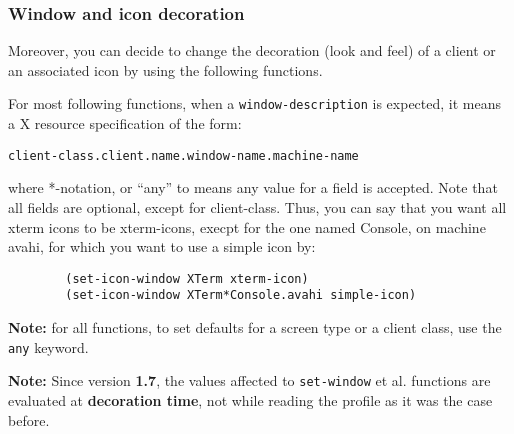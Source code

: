 \subsubsection{Window and icon decoration}

Moreover, you can decide to change the decoration (look and feel)
of a client or an associated icon by using the following functions.

For most following functions, when a \verb|window-description| is expected, it
means a X resource specification of the form:
\begin{verbatim}
client-class.client.name.window-name.machine-name
\end{verbatim}
where *-notation, or ``any'' to means any value for a field is accepted. Note
that all fields are optional, except for client-class.
Thus, you can say that you want all xterm icons to be xterm-icons, execpt for
the one named Console, on machine avahi, for which you want to use
a simple icon by:
{\exemplefont\begin{verbatim}
        (set-icon-window XTerm xterm-icon)
        (set-icon-window XTerm*Console.avahi simple-icon)
\end{verbatim}}

{\bf Note:} for all functions, to set defaults for a screen type or a client
class, use the \verb"any" keyword.

{\bf Note:} Since version {\bf 1.7}, the values affected to \verb|set-window|
et al. functions are evaluated at {\bf decoration time}, not while reading the
profile as it was the case before.

